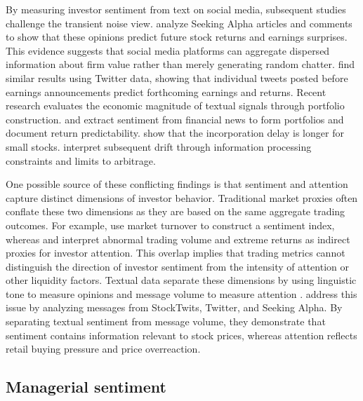 By measuring investor sentiment from text on social media, subsequent studies challenge the transient noise view. \citet{chen2014} analyze Seeking Alpha articles and comments to show that these opinions predict future stock returns and earnings surprises. This evidence suggests that social media platforms can aggregate dispersed information about firm value rather than merely generating random chatter. \citet{bartov2018} find similar results using Twitter data, showing that individual tweets posted before earnings announcements predict forthcoming earnings and returns. Recent research evaluates the economic magnitude of textual signals through portfolio construction. \citet{ke2021predicting} and \citet{lopez2023chatgpt} extract sentiment from financial news to form portfolios and document return predictability. \citet{ke2021predicting} show that the incorporation delay is longer for small stocks. \citet{lopez2023chatgpt} interpret subsequent drift through information processing constraints and limits to arbitrage.

One possible source of these conflicting findings is that sentiment and attention capture distinct dimensions of investor behavior. Traditional market proxies often conflate these two dimensions as they are based on the same aggregate trading outcomes. For example, \citet{baker2006} use market turnover to construct a sentiment index, whereas \citet{barber2008} and \citet{da2011} interpret abnormal trading volume and extreme returns as indirect proxies for investor attention. This overlap implies that trading metrics cannot distinguish the direction of investor sentiment from the intensity of attention or other liquidity factors. Textual data separate these dimensions by using linguistic tone to measure opinions and message volume to measure attention \citep{antweiler2004}. \citet{cookson2024} address this issue by analyzing messages from StockTwits, Twitter, and Seeking Alpha. By separating textual sentiment from message volume, they demonstrate that sentiment contains information relevant to stock prices, whereas attention reflects retail buying pressure and price overreaction.

\subsection{Managerial sentiment}

